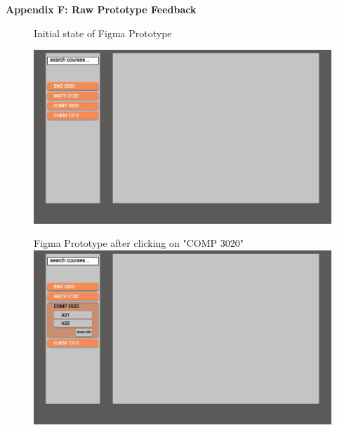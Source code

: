 \documentclass{article}
\begin{document}





\newpage	
\vspace*{40mm}
\begin{centering}
	{\huge\bfseries Appendix F: Raw Prototype Feedback}\\[0.4cm] 
\end{centering}

\newpage

    

    \begin{figure}[h]
        \centering
        Initial state of Figma Prototype
        
        \includegraphics[width=12cm]{ViewCourseInfo_Prototype/Course_Instructor1.jpg}
    \end{figure}
    	
    \vspace{10mm}
    	
    \begin{figure}[h]
        \centering
        Figma Prototype after clicking on "COMP 3020"
        \includegraphics[width=12cm]{ViewCourseInfo_Prototype/Course_Instructor2.jpg}
    \end{figure}
	
\end{document}
